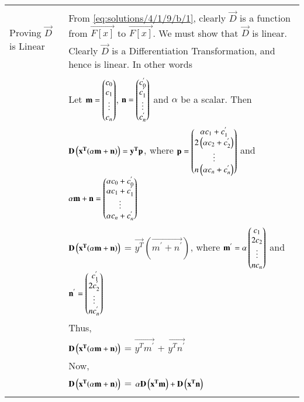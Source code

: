 \begin{table*}[!ht]
	\begin{tabular}{|l|l|}
		\hline
		\multirow{3}{*}{Proving $\vec{D}$ is Linear} & \\
		& From \eqref{eq:solutions/4/1/9/b/1}, clearly $\vec{D}$ is a function from $\vec{F[x]}$ to $\vec{F[x]}$. We must show that $\vec{D}$ is linear.\\
		& Clearly $\vec{D}$ is a Differentiation Transformation, and hence is linear. In other words \\
		& \\
		& Let $\mathbf{m} = \begin{pmatrix}c_0 \\ c_1 \\ \vdots \\c_n\end{pmatrix}$, $\mathbf{n} = \begin{pmatrix}c_0^{'} \\ c_1^{'} \\ \vdots \\ c_n^{'}\end{pmatrix}$ and $\alpha$ be a scalar. Then\\
		& \qquad \qquad  $\mathbf{D}\left(\mathbf{x^T(\alpha m + n)}\right) = \mathbf{y^{T}p}$, where $\mathbf{p} = \begin{pmatrix}\alpha c_1 + c_1 ^{'} \\ 2\left(\alpha c_2 + c_2 ^{'}\right) \\ \vdots \\ n\left(\alpha c_n + c_n ^{'}\right)\end{pmatrix}$  and $\mathbf{\alpha m + n} = \begin{pmatrix}\alpha c_0 + c_0^{'} \\ \alpha c_1 + c_1^{'} \\ \vdots \\ \alpha c_n + c_n^{'} \end{pmatrix}$\\
		& \qquad \qquad  $\mathbf{D}\left(\mathbf{x^T(\alpha m + n)}\right)$ = $\vec{y^{T}}(\vec{m^{'} + n^{'}})$, where $\mathbf{m^{'}} = \alpha\begin{pmatrix}c_1 \\ 2c_2 \\ \vdots \\ nc_n\end{pmatrix}$ and $\mathbf{n^{'}} = \begin{pmatrix}\ c_1^{'} \\ 2c_2^{'} \\ \vdots \\ nc_n^{'}\end{pmatrix}$\\
		& Thus,\\
		& \qquad \qquad $\mathbf{D}\left(\mathbf{x^T(\alpha m + n)}\right)$ = $\vec{y^{T}m^{'}}$ + $\vec{y^{T}n^{'}}$ \\
        & Now,\\	
		& \qquad \qquad $\mathbf{D}\left(\mathbf{x^T(\alpha m + n)}\right)$ = $\alpha\mathbf{D}\left(\mathbf{x^{T}m}\right) + \mathbf{D}\left(\mathbf{x^{T}n}\right) $\\
		& \\

\end{tabular}
\end{table*}
